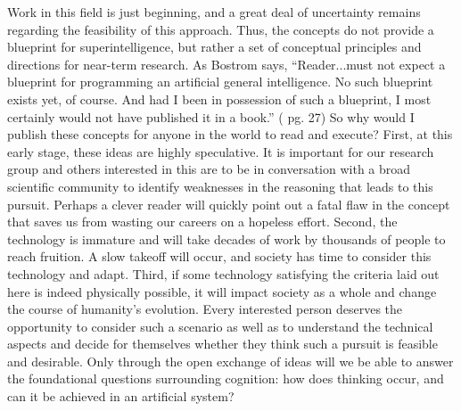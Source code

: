 Work in this field is just beginning, and a great deal of uncertainty remains regarding the feasibility of this approach. Thus, the concepts do not provide a blueprint for superintelligence, but rather a set of conceptual principles and directions for near-term research. As Bostrom says, ``Reader...must not expect a blueprint for programming an artificial general intelligence. No such blueprint exists yet, of course. And had I been in possession of such a blueprint, I most certainly would not have published it in a book.'' (\cite{bo2014} pg. 27) So why would I publish these concepts for anyone in the world to read and execute? First, at this early stage, these ideas are highly speculative. It is important for our research group and others interested in this are to be in conversation with a broad scientific community to identify weaknesses in the reasoning that leads to this pursuit. Perhaps a clever reader will quickly point out a fatal flaw in the concept that saves us from wasting our careers on a hopeless effort. Second, the technology is immature and will take decades of work by thousands of people to reach fruition. A slow takeoff will occur, and society has time to consider this technology and adapt. Third, if some technology satisfying the criteria laid out here is indeed physically possible, it will impact society as a whole and change the course of humanity's evolution. Every interested person deserves the opportunity to consider such a scenario as well as to understand the technical aspects and decide for themselves whether they think such a pursuit is feasible and desirable. Only through the open exchange of ideas will we be able to answer the foundational questions surrounding cognition: how does thinking occur, and can it be achieved in an artificial system?

